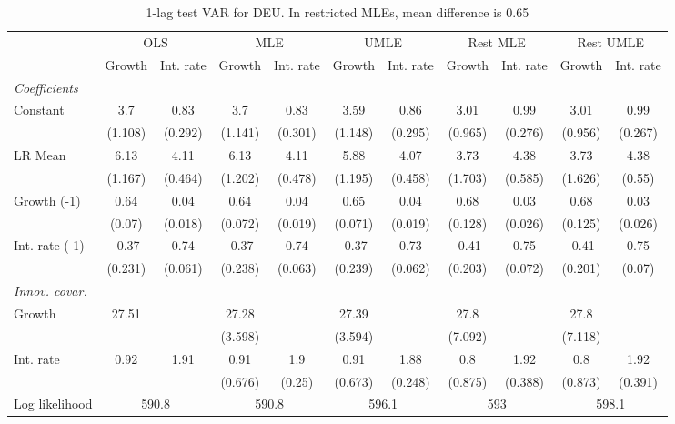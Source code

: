 \begin{table}[htbp] 
	\centering
	\begin{tabular}{@{\extracolsep{4pt}}lcccccccccc@{}}		\hline\hline
		 		 & \multicolumn{2}{c}{OLS} &\multicolumn{2}{c}{MLE} &\multicolumn{2}{c}{UMLE} &\multicolumn{2}{c}{Rest MLE} &\multicolumn{2}{c}{Rest UMLE} \\ 
 		 & Growth 	 & Int. rate 	 & Growth 	 & Int. rate 	 & Growth 	 & Int. rate 	 & Growth 	 & Int. rate 	 & Growth 	 & Int. rate\\\cline{2-3}\cline{4-5}\cline{6-7}\cline{8-9}\cline{10-11}
\rule{0pt}{4ex} 
 \emph{Coefficients} 	  		 & 		 & 		 & 		 & 		 & 		 & 		 & 		 & 		 & 		 &\\ 
\quad Constant 	 & 3.7 	 & 0.83 	 & 3.7 	 & 0.83 	 & 3.59 	 & 0.86 	 & 3.01 	 & 0.99 	 & 3.01 	 & 0.99	 \\ 
 		 & (1.108) 	 & (0.292) 	 & (1.141) 	 & (0.301) 	 & (1.148) 	 & (0.295) 	 & (0.965) 	 & (0.276) 	 & (0.956) 	 & (0.267) 	 \\ 
\quad LR Mean 	 & 6.13 	 & 4.11 	 & 6.13 	 & 4.11 	 & 5.88 	 & 4.07 	 & 3.73 	 & 4.38 	 & 3.73 	 & 4.38	 \\ 
 		 & (1.167) 	 & (0.464) 	 & (1.202) 	 & (0.478) 	 & (1.195) 	 & (0.458) 	 & (1.703) 	 & (0.585) 	 & (1.626) 	 & (0.55) 	 \\ 
\quad Growth (-1) 	 &0.64 	 & 0.04 	 & 0.64 	 & 0.04 	 & 0.65 	 & 0.04 	 & 0.68 	 & 0.03 	 & 0.68 	 & 0.03	 \\ 
 		 & (0.07) 	 & (0.018) 	 & (0.072) 	 & (0.019) 	 & (0.071) 	 & (0.019) 	 & (0.128) 	 & (0.026) 	 & (0.125) 	 & (0.026) 	 \\ 
\quad Int. rate (-1) 	 &-0.37 	 & 0.74 	 & -0.37 	 & 0.74 	 & -0.37 	 & 0.73 	 & -0.41 	 & 0.75 	 & -0.41 	 & 0.75	 \\ 
 		 & (0.231) 	 & (0.061) 	 & (0.238) 	 & (0.063) 	 & (0.239) 	 & (0.062) 	 & (0.203) 	 & (0.072) 	 & (0.201) 	 & (0.07) 	 \\ 
\rule{0pt}{4ex} \emph{Innov. covar.}  	 & 	 & 	 & 	 & 	 & 	 & 	 & 	 & 	 & 	 &\\ 
\quad Growth 	 &27.51 	 &  	 & 27.28 	 &  	 & 27.39 	 &  	 & 27.8 	 &  	 & 27.8 	 & 	 \\ 
 		 &  	 &  	 & (3.598) 	 &  	 & (3.594) 	 &  	 & (7.092) 	 &  	 & (7.118) 	 &  	 \\ 
\quad Int. rate 	 &0.92 	 & 1.91 	 & 0.91 	 & 1.9 	 & 0.91 	 & 1.88 	 & 0.8 	 & 1.92 	 & 0.8 	 & 1.92	 \\ 
 		 &  	 &  	 & (0.676) 	 & (0.25) 	 & (0.673) 	 & (0.248) 	 & (0.875) 	 & (0.388) 	 & (0.873) 	 & (0.391) 	 \\ 
 \hline \rule{0pt}{4ex} 
  Log likelihood 	 &\multicolumn{2}{c}{590.8} 	 & \multicolumn{2}{c}{590.8} 	 & \multicolumn{2}{c}{596.1} 	 & \multicolumn{2}{c}{593} 	 & \multicolumn{2}{c}{598.1}\\ 

 \hline 	\end{tabular}		\caption{1-lag test VAR for DEU. In restricted MLEs, mean difference is 0.65}
		\label{tab:DEU1}

\end{table}